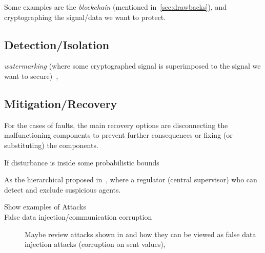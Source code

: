 \documentclass[../main.tex]{subfiles}
\begin{document}
Some examples are the \emph{blockchain} (mentioned in~\ref{sec:drawbacks}), and cryptographing the signal/data we want to protect.

\subsection{Detection/Isolation}
\emph{watermarking} (where some cryptographed signal is superimposed to the signal we want to secure)~\cite{MoEtAl2015,SatchidanandanKumar2017,KshetriVoas2017,LuciaEtAl2021},
\cite{FortiEtAl2016}

\subsection{Mitigation/Recovery}
For the cases of faults, the main recovery options are disconnecting the malfunctioning components to prevent further consequences or fixing (or substituting) the components.

If disturbance is inside some probabilistic bounds \cite{AnandutaEtAl2020}



As the hierarchical proposed in~\cite{BraunEtAl2020}, where a regulator (central supervisor) who can detect and exclude suspicious agents.


\begin{description}
  \item[Show examples of Attacks]
  \item[False data injection/communication corruption] Maybe review attacks shown in \cite{VelardeEtAl2018} and how they can be viewed as false data injection attacks (corruption on sent values), 
\end{description}
\end{document}
